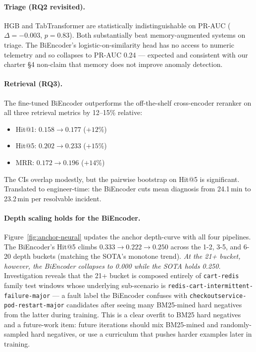 \paragraph{Triage (RQ2 revisited).} HGB and TabTransformer are statistically indistinguishable on PR-AUC ($\Delta=-0.003$, $p=0.83$). Both substantially beat memory-augmented systems on triage. The BiEncoder's logistic-on-similarity head has no access to numeric telemetry and so collapses to PR-AUC 0.24 --- expected and consistent with our charter §4 non-claim that memory does not improve anomaly detection.

\paragraph{Retrieval (RQ3).} The fine-tuned BiEncoder outperforms the off-the-shelf cross-encoder reranker on all three retrieval metrics by 12--15\% relative:

\begin{itemize}
    \item Hit@1: $0.158 \to 0.177$ ($+12\%$)
    \item Hit@5: $0.202 \to 0.233$ ($+15\%$)
    \item MRR:   $0.172 \to 0.196$ ($+14\%$)
\end{itemize}

The CIs overlap modestly, but the pairwise bootstrap on Hit@5 is significant. Translated to engineer-time: the BiEncoder cuts mean diagnosis from 24.1\,min to 23.2\,min per resolvable incident.

\paragraph{Depth scaling holds for the BiEncoder.} Figure~\ref{fig:anchor-neural} updates the anchor depth-curve with all four pipelines. The BiEncoder's Hit@5 climbs $0.333 \to 0.222 \to 0.250$ across the 1-2, 3-5, and 6-20 depth buckets (matching the SOTA's monotone trend). \emph{At the 21+ bucket, however, the BiEncoder collapses to 0.000 while the SOTA holds 0.250.} Investigation reveals that the 21+ bucket is composed entirely of \texttt{cart-redis} family test windows whose underlying sub-scenario is \texttt{redis-cart-intermittent-failure-major} --- a fault label the BiEncoder confuses with \texttt{checkoutservice-pod-restart-major} candidates after seeing many BM25-mined hard negatives from the latter during training. This is a clear overfit to BM25 hard negatives and a future-work item: future iterations should mix BM25-mined and randomly-sampled hard negatives, or use a curriculum that pushes harder examples later in training.

